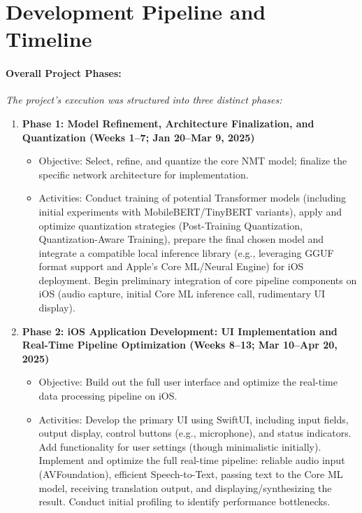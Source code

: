 \documentclass[12pt]{article}
\begin{document}
\section{Development Pipeline and Timeline}

\paragraph{Overall Project Phases:}
\emph{The project's execution was structured into three distinct phases:}
\begin{enumerate}
    \item \textbf{Phase 1: Model Refinement, Architecture Finalization, and Quantization (Weeks 1--7; Jan 20--Mar 9, 2025)}
    \begin{itemize}
        \item Objective: Select, refine, and quantize the core NMT model; finalize the specific network architecture for implementation.
        \item Activities: Conduct training of potential Transformer models (including initial experiments with MobileBERT/TinyBERT variants), apply and optimize quantization strategies (Post-Training Quantization, Quantization-Aware Training), prepare the final chosen model and integrate a compatible local inference library (e.g., leveraging GGUF format support and Apple's Core ML/Neural Engine) for iOS deployment. Begin preliminary integration of core pipeline components on iOS (audio capture, initial Core ML inference call, rudimentary UI display).
    \end{itemize}
    \item \textbf{Phase 2: iOS Application Development: UI Implementation and Real-Time Pipeline Optimization (Weeks 8--13; Mar 10--Apr 20, 2025)}
    \begin{itemize}
        \item Objective: Build out the full user interface and optimize the real-time data processing pipeline on iOS.
        \item Activities: Develop the primary UI using SwiftUI, including input fields, output display, control buttons (e.g., microphone), and status indicators. Add functionality for user settings (though minimalistic initially). Implement and optimize the full real-time pipeline: reliable audio input (AVFoundation), efficient Speech-to-Text, passing text to the Core ML model, receiving translation output, and displaying/synthesizing the result. Conduct initial profiling to identify performance bottlenecks.
    \end{itemize}

\end{enumerate}
\end{document}
